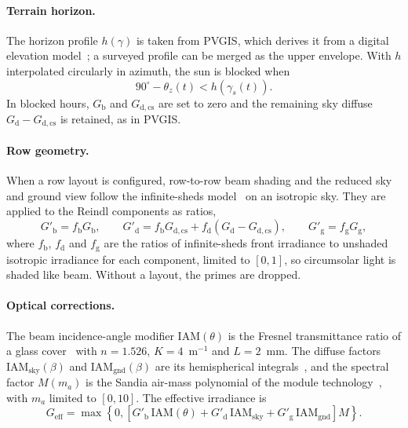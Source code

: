 \documentclass[11pt]{article}
\begin{document}
\paragraph{Terrain horizon.}
The horizon profile $h(\gamma)$ is taken from PVGIS, which derives it from a digital elevation model~\cite{huldNewSolarRadiation2012}; a surveyed profile can be merged as the upper envelope. With $h$ interpolated circularly in azimuth, the sun is blocked when
\begin{equation}
90^{\circ}-\theta_z(t) < h\left(\gamma_s(t)\right).
\label{eq:horizon}
\end{equation}
In blocked hours, $G_{\mathrm{b}}$ and $G_{\mathrm{d,cs}}$ are set to zero and the remaining sky diffuse $G_{\mathrm{d}}-G_{\mathrm{d,cs}}$ is retained, as in PVGIS.

\paragraph{Row geometry.}
When a row layout is configured, row-to-row beam shading and the reduced sky and ground view follow the infinite-sheds model~\cite{mikofski2019infiniteSheds} on an isotropic sky. They are applied to the Reindl components as ratios,
\begin{equation}
G'_{\mathrm{b}} = f_{\mathrm{b}}G_{\mathrm{b}},\qquad
G'_{\mathrm{d}} = f_{\mathrm{b}}G_{\mathrm{d,cs}} + f_{\mathrm{d}}\left(G_{\mathrm{d}}-G_{\mathrm{d,cs}}\right),\qquad
G'_{\mathrm{g}} = f_{\mathrm{g}}G_{\mathrm{g}},
\label{eq:rows}
\end{equation}
where $f_{\mathrm{b}}$, $f_{\mathrm{d}}$ and $f_{\mathrm{g}}$ are the ratios of infinite-sheds front irradiance to unshaded isotropic irradiance for each component, limited to $[0,1]$, so circumsolar light is shaded like beam. Without a layout, the primes are dropped.

\paragraph{Optical corrections.}
The beam incidence-angle modifier $\mathrm{IAM}(\theta)$ is the Fresnel transmittance ratio of a glass cover~\cite{desotoImprovementValidationModel2006} with $n=1.526$, $K=4$~m$^{-1}$ and $L=2$~mm. The diffuse factors $\mathrm{IAM}_{\mathrm{sky}}(\beta)$ and $\mathrm{IAM}_{\mathrm{gnd}}(\beta)$ are its hemispherical integrals~\cite{marion2017diffuseIAM}, and the spectral factor $M(m_a)$ is the Sandia air-mass polynomial of the module technology~\cite{kingPhotovoltaicArray2004}, with $m_a$ limited to $[0,10]$. The effective irradiance is
\begin{equation}
G_{\mathrm{eff}}=\max\left\{0,\left[G'_{\mathrm{b}}\,\mathrm{IAM}(\theta)+G'_{\mathrm{d}}\,\mathrm{IAM}_{\mathrm{sky}}+G'_{\mathrm{g}}\,\mathrm{IAM}_{\mathrm{gnd}}\right]M\right\}.
\label{eq:geff}
\end{equation}
\end{document}

